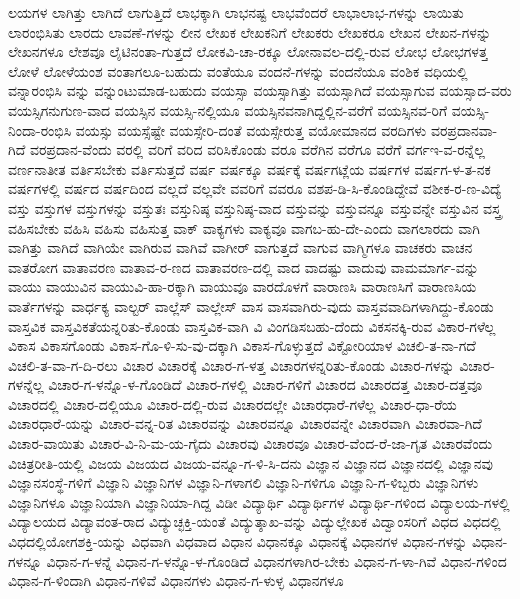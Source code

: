 {ಲಯಗಳ
ಲಾಗಿತ್ತು
ಲಾಗಿದೆ
ಲಾಗುತ್ತಿದೆ
ಲಾಭಕ್ಕಾಗಿ
ಲಾಭನಷ್ಟ
ಲಾಭವೆಂದರೆ
ಲಾಭಾಲಾಭ-ಗಳನ್ನು
ಲಾಯಿತು
ಲಾರಂಭಿಸಿತು
ಲಾರದು
ಲಾವಣೆ-ಗಳನ್ನು
ಲೀನ
ಲೇಖಕ
ಲೇಖಕನಿಗೆ
ಲೇಖಕರು
ಲೇಖಕರೂ
ಲೇಖನ
ಲೇಖನ-ಗಳನ್ನು
ಲೇಖನಗಳೂ
ಲೇಶವೂ
ಲೈಟಿನಂತಾ-ಗುತ್ತದೆ
ಲೋಕವಿ-ಚಾ-ರಕ್ಕೂ
ಲೋನಾವಲ-ದಲ್ಲಿ-ರುವ
ಲೋಭ
ಲೋಭಗಳತ್ತ
ಲೋಳೆ
ಲೋಳೆಯಂಶ
ವಂತಾಗಲೂ-ಬಹುದು
ವಂತೆಯೂ
ವಂದನೆ-ಗಳನ್ನು
ವಂದನೆಯೂ
ವಂಶಿಕ
ವಧಿಯಲ್ಲಿ
ವನ್ನಾರಂಭಿಸಿ
ವನ್ನು
ವನ್ನುಂಟುಮಾಡ-ಬಹುದು
ವಯಸ್ಸಾ
ವಯಸ್ಸಾಗಿತ್ತು
ವಯಸ್ಸಾಗಿದೆ
ವಯಸ್ಸಾಗುವ
ವಯಸ್ಸಾದ-ವರು
ವಯಸ್ಸಿಗನುಗುಣ-ವಾದ
ವಯಸ್ಸಿನ
ವಯಸ್ಸಿ-ನಲ್ಲಿಯೂ
ವಯಸ್ಸಿನವನಾಗಿದ್ದಲ್ಲಿನ-ವರೆಗೆ
ವಯಸ್ಸಿನವ-ರಿಗೆ
ವಯಸ್ಸಿ-ನಿಂದಾ-ರಂಭಿಸಿ
ವಯಸ್ಸು
ವಯಸ್ಸೆಷ್ಟೇ
ವಯಸ್ಸೇರಿ-ದಂತೆ
ವಯಸ್ಸೇರುತ್ತ
ವಯೋಮಾನದ
ವರದಿಗಳು
ವರಪ್ರದಾನವಾ-ಗಿದೆ
ವರಪ್ರದಾನ-ವೆಂದು
ವರಲ್ಲಿ
ವರಿಗೆ
ವರಿದ
ವರಿಸಿಕೊಂಡು
ವರೂ
ವರೆಗಿನ
ವರೆಗೂ
ವರೆಗೆ
ವರ್ಗಇ-ವ-ರನ್ನೆಲ್ಲ
ವರ್ಣನಾತೀತ
ವರ್ತಿಸಬೇಕು
ವರ್ತಿಸುತ್ತದೆ
ವರ್ಷ
ವರ್ಷಕ್ಕೂ
ವರ್ಷಕ್ಕೆ
ವರ್ಷಗಟ್ಲೆಯ
ವರ್ಷಗಳ
ವರ್ಷಗ-ಳ-ತ-ನಕ
ವರ್ಷಗಳಲ್ಲಿ
ವರ್ಷದ
ವರ್ಷದಿಂದ
ವಲ್ಲದೆ
ವಲ್ಲವೇ
ವವರಿಗೆ
ವವರೂ
ವಶಪ-ಡಿ-ಸಿ-ಕೊಂಡಿದ್ದೇವೆ
ವಶೀಕ-ರ-ಣ-ವಿದ್ಯೆ
ವಸ್ತು
ವಸ್ತುಗಳ
ವಸ್ತುಗಳನ್ನು
ವಸ್ತುತಃ
ವಸ್ತುನಿಷ್ಠ
ವಸ್ತುನಿಷ್ಠ-ವಾದ
ವಸ್ತುವನ್ನು
ವಸ್ತುವನ್ನೂ
ವಸ್ತುವನ್ನೇ
ವಸ್ತುವಿನ
ವಸ್ತ್ರ
ವಹಿಸಬೇಕು
ವಹಿಸಿ
ವಹಿಸು
ವಹಿಸುತ್ತ
ವಾಕ್
ವಾಕ್ಯಗಳು
ವಾಕ್ಯವೂ
ವಾಗಬ-ಹು-ದೇ-ಎಂದು
ವಾಗಲಾರದು
ವಾಗಿ
ವಾಗಿತ್ತು
ವಾಗಿದೆ
ವಾಗಿಯೇ
ವಾಗಿರುವ
ವಾಗಿವೆ
ವಾಗೀರ್
ವಾಗುತ್ತದೆ
ವಾಗುವ
ವಾಗ್ಮಿಗಳೂ
ವಾಚಕರು
ವಾಚನ
ವಾತರೋಗ
ವಾತಾವರಣ
ವಾತಾವ-ರ-ಣದ
ವಾತಾವರಣ-ದಲ್ಲಿ
ವಾದ
ವಾದಷ್ಟು
ವಾದುವು
ವಾಮಮಾರ್ಗ-ವನ್ನು
ವಾಯು
ವಾಯುವಿನ
ವಾಯುವಿ-ಹಾ-ರಕ್ಕಾಗಿ
ವಾಯುವೂ
ವಾರದೊಳಗೆ
ವಾರಾಣಸಿ
ವಾರಾಣಸಿಗೆ
ವಾರಾಣಸಿಯ
ವಾರ್ತೆಗಳನ್ನು
ವಾರ್ಧಕ್ಯ
ವಾಲ್ಟರ್
ವಾಲ್ಲೆಸ್
ವಾಲ್ಲೇಸ್
ವಾಸ
ವಾಸವಾಗಿರು-ವುದು
ವಾಸ್ತವವಾದಿಗಳಾಗಿದ್ದು-ಕೊಂಡು
ವಾಸ್ತವಿಕ
ವಾಸ್ತವಿಕತೆಯನ್ನರಿತು-ಕೊಂಡು
ವಾಸ್ತವಿಕ-ವಾಗಿ
ವಿ
ವಿಂಗಡಿಸಬಹು-ದೆಂದು
ವಿಕಸನಕ್ಕಿ-ರುವ
ವಿಕಾರ-ಗಳೆಲ್ಲ
ವಿಕಾಸ
ವಿಕಾಸಗೊಂಡು
ವಿಕಾಸ-ಗೊ-ಳಿ-ಸು-ವು-ದಕ್ಕಾಗಿ
ವಿಕಾಸ-ಗೊಳ್ಳುತ್ತದೆ
ವಿಕ್ಟೋರಿಯಾಳ
ವಿಚಲಿ-ತ-ನಾ-ಗದೆ
ವಿಚಲಿ-ತ-ವಾ-ಗ-ದಿ-ರಲು
ವಿಚಾರ
ವಿಚಾರಕ್ಕೆ
ವಿಚಾರ-ಗ-ಳತ್ತ
ವಿಚಾರಗಳನ್ನರಿತು-ಕೊಂಡು
ವಿಚಾರ-ಗಳನ್ನು
ವಿಚಾರ-ಗಳನ್ನೆಲ್ಲ
ವಿಚಾರ-ಗ-ಳನ್ನೊ-ಳ-ಗೊಂಡಿದೆ
ವಿಚಾರ-ಗಳಲ್ಲಿ
ವಿಚಾರ-ಗಳಿಗೆ
ವಿಚಾರದ
ವಿಚಾರದತ್ತ
ವಿಚಾರ-ದತ್ತವೂ
ವಿಚಾರದಲ್ಲಿ
ವಿಚಾರ-ದಲ್ಲಿಯೂ
ವಿಚಾರ-ದಲ್ಲಿ-ರುವ
ವಿಚಾರದಲ್ಲೇ
ವಿಚಾರಧಾರೆ-ಗಳೆಲ್ಲ
ವಿಚಾರ-ಧಾ-ರೆಯ
ವಿಚಾರಧಾರೆ-ಯನ್ನು
ವಿಚಾರ-ವನ್ನ-ರಿತ
ವಿಚಾರವನ್ನು
ವಿಚಾರವನ್ನೂ
ವಿಚಾರವನ್ನೇ
ವಿಚಾರವಾಗಿ
ವಿಚಾರವಾ-ಗಿದೆ
ವಿಚಾರ-ವಾಯಿತು
ವಿಚಾರ-ವಿ-ನಿ-ಮ-ಯ-ಗೈದು
ವಿಚಾರವು
ವಿಚಾರವೂ
ವಿಚಾರ-ವೆಂದ-ರೆ-ಜಾ-ಗೃತ
ವಿಚಾರವೆಂದು
ವಿಚಿತ್ರರೀತಿ-ಯಲ್ಲಿ
ವಿಜಯ
ವಿಜಯದ
ವಿಜಯ-ವನ್ನೂ-ಗ-ಳಿ-ಸಿ-ದನು
ವಿಜ್ಞಾನ
ವಿಜ್ಞಾನದ
ವಿಜ್ಞಾನದಲ್ಲಿ
ವಿಜ್ಞಾನವು
ವಿಜ್ಞಾನಸಂಸ್ಥೆ-ಗಳಿಗೆ
ವಿಜ್ಞಾನಿ
ವಿಜ್ಞಾನಿಗಳ
ವಿಜ್ಞಾನಿ-ಗಳಾಗಲಿ
ವಿಜ್ಞಾನಿ-ಗಳಿಗೂ
ವಿಜ್ಞಾನಿ-ಗ-ಳಿಬ್ಬರು
ವಿಜ್ಞಾನಿಗಳು
ವಿಜ್ಞಾನಿಗಳೂ
ವಿಜ್ಞಾನಿಯಾಗಿ
ವಿಜ್ಞಾನಿಯಾ-ಗಿದ್ದ
ವಿಡೀ
ವಿದ್ಯಾರ್ಥಿ
ವಿದ್ಯಾರ್ಥಿಗಳ
ವಿದ್ಯಾರ್ಥಿ-ಗಳಿಂದ
ವಿದ್ಯಾಲಯ-ಗಳಲ್ಲಿ
ವಿದ್ಯಾಲಯದ
ವಿದ್ಯಾವಂತ-ರಾದ
ವಿದ್ಯುಚ್ಛಕ್ತಿ-ಯಂತೆ
ವಿದ್ಯುತ್ಶಾಖ-ವನ್ನು
ವಿದ್ಯುಲ್ಲೇಖಕ
ವಿದ್ವಾಂಸರಿಗೆ
ವಿಧದ
ವಿಧದಲ್ಲಿ
ವಿಧದಲ್ಲಿಯೋಗಶಕ್ತಿ-ಯನ್ನು
ವಿಧವಾಗಿ
ವಿಧವಾದ
ವಿಧಾನ
ವಿಧಾನಕ್ಕೂ
ವಿಧಾನಕ್ಕೆ
ವಿಧಾನಗಳ
ವಿಧಾನ-ಗಳನ್ನು
ವಿಧಾನ-ಗಳನ್ನೂ
ವಿಧಾನ-ಗ-ಳನ್ನೆ
ವಿಧಾನ-ಗ-ಳನ್ನೊ-ಳ-ಗೊಂಡಿದೆ
ವಿಧಾನಗಳಾಗಿರ-ಬೇಕು
ವಿಧಾನ-ಗ-ಳಾ-ಗಿವೆ
ವಿಧಾನ-ಗಳಿಂದ
ವಿಧಾನ-ಗ-ಳಿಂದಾಗಿ
ವಿಧಾನ-ಗಳಿವೆ
ವಿಧಾನಗಳು
ವಿಧಾನ-ಗ-ಳುಳ್ಳ
ವಿಧಾನಗಳೂ
}
